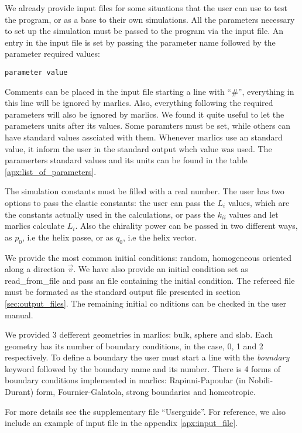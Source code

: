 \documentclass[final,5p,times,twocolumn]{elsarticle}
\begin{document}
We already provide input files for some situations that the user can
use to test the program, or as a base to their own simulations. All
the parameters necessary to set up the simulation must be passed to
the program via the input file. An entry in the input file is set by passing the parameter name
followed by the parameter required values:
\begin{lstlisting}
parameter value
\end{lstlisting}
Comments can be placed in the input file starting a line with ``\#'',
everything in this line will be ignored by marlics. Also, everything
following the required parameters will also be ignored by marlics. We
found it quite useful to let the parameters units after its values. Some paramters must be set, while others can have standard values assciated with them. Whenever marlics use an standard value, it inform the user in the standard output whch value was used.
The paramerters standard values and its  units can be found in the table \ref{apx:list_of_parameters}.

The simulation constants must be filled with a real number. The user has two options to pass the elastic constants: the user can pass the $L_i$ values, which are the constants actually used in the calculations, or pass the $k_{ii}$ values and let marlics calculate $L_i$. 
Also the chirality power can be passed in two different ways, as $p_0$, i.e the helix passe, or as $q_0$, i.e the helix vector.

We provide the most common initial conditions: random, homogeneous oriented along a direction $\vec{v}$. We have also provide an initial condition set as read\_from\_file and pass an file containing the initial condition. The refereed file must be formated as the standard output file presented in section \ref{sec:output_files}. The remaining initial co nditions can be checked in the user manual.

We provided 3 defferent geometries in marlics: bulk, sphere and slab. Each geometry has its number of boundary conditions, in the case, 0, 1 and 2 respectively. To define a boundary the user must start a line with the \textit{boundary} keyword followed by the boundary name and its number. There is 4 forms of boundary conditions implemented in marlics: Rapinni-Papoular (in Nobili-Durant) form, Fournier-Galatola, strong boundaries and homeotropic.

For more details see the supplementary file ``Userguide''.  For
reference, we also include an example of input file in the appendix
\ref{apx:input_file}.
\end{document}
